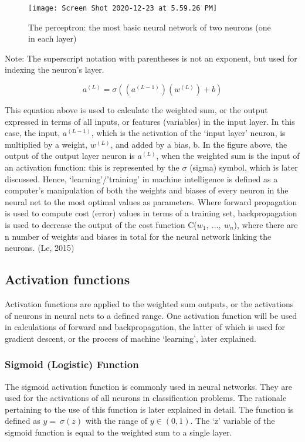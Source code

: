 \documentclass[12pt,a4paper]{article}
\begin{document}
\begin{figure}[h]
    \centering
    \texttt{[image: Screen Shot 2020-12-23 at 5.59.26 PM]}
    \caption{The perceptron: the most basic neural network of two neurons (one in each layer)}
    \label{fig:my_label}
\end{figure}

Note: The superscript notation with parentheses is not an exponent, but used for indexing the neuron’s layer.

\begin{equation}
    a^{\left(L\right)}=\sigma\left(\left(a^{\left(L-1\right)}\right)\left(w^{(L)}\right)+b\right)
\end{equation}

This equation above is used to calculate the weighted sum, or the output expressed in terms of all inputs, or features (variables) in the input layer. In this case, the input, $a^{(L-1)}$, which is the activation of the ‘input layer’ neuron, is multiplied by a weight, $w^{(L)}$, and added by a bias, b. In the figure above, the output of the output layer neuron is $a^{\left(L\right)}$, when the weighted sum is the input of an activation function: this is represented by the $\sigma$ (sigma) symbol, which is later discussed. Hence, ‘learning’/’training’ in machine intelligence is defined as a computer’s manipulation of both the weights and biases of every neuron in the neural net to the most optimal values as parameters. Where forward propagation is used to compute cost (error) values in terms of a training set, backpropagation is used to decrease the output of the cost function C($w_1,\ \ldots,\ w_n$), where there are n number of weights and biases in total for the neural network linking the neurons. (Le, 2015)




\subsection{Activation functions}
Activation functions are applied to the weighted sum outputs, or the activations of neurons in neural nets to a defined range. One activation function will be used in calculations of forward and backpropagation, the latter of which is used for gradient descent, or the process of machine ‘learning’, later explained.

\subsubsection{Sigmoid (Logistic) Function}
The sigmoid activation function is commonly used in neural networks. They are used for the activations of all neurons in classification problems. The rationale pertaining to the use of this function is later explained in detail. The function is defined as  $ y=\ \sigma\left(z\right) $ with the range of $ y\in\left(0,1\right) $. The ‘z’ variable of the sigmoid function is equal to the weighted sum to a single layer.
\end{document}
